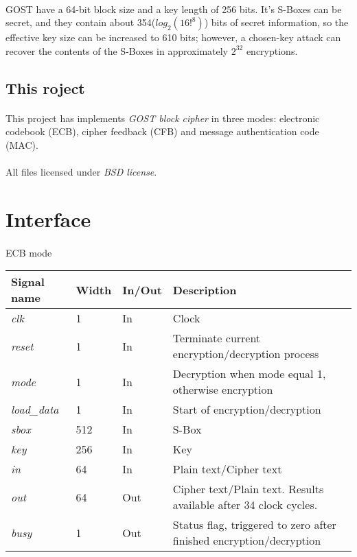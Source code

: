 \documentclass[a4paper,12pt]{article}
\begin{document}
\paragraph{}
GOST have a 64-bit block size and a key length of 256 bits.
It's S-Boxes can be secret, and they contain about 354($log_2(16!^8)$) bits of
secret information, so the effective key size can be increased to 610 bits;
however, a chosen-key attack can recover the contents of the S-Boxes
in approximately $2^{32}$ encryptions.

\subsection{This roject}
\paragraph{}
This project has implements \textsl{GOST block cipher} in three modes:
electronic codebook (ECB), cipher feedback (CFB) and message authentication code (MAC).
\paragraph{}
All files licensed under \textsl{BSD license}.


\newpage
\section{Interface}

\paragraph{}
ECB mode\\
{\renewcommand{\arraystretch}{1.2}
\begin{tabularx}{\textwidth}{l|l l X}
\hline
Signal name & Width & In/Out & Description\\
\hline
\textsl{clk}        & 1   & In  & Clock\\
\textsl{reset}      & 1   & In  & Terminate current encryption/decryption process \\
\textsl{mode}       & 1   & In  & Decryption when mode equal 1, otherwise encryption\\
\textsl{load\_data} & 1   & In  & Start of encryption/decryption \\
\textsl{sbox}       & 512 & In  & S-Box \\
\textsl{key}        & 256 & In  & Key \\
\textsl{in}         & 64  & In  & Plain text/Cipher text \\
\textsl{out}        & 64  & Out & Cipher text/Plain text. Results available after 34 clock cycles. \\
\textsl{busy}       & 1   & Out & Status flag, triggered to zero after finished encryption/decryption \\
\hline
\end{tabularx}}
\end{document}
